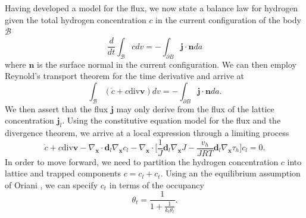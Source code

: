 \documentclass[10pt]{elsarticle}
\newcommand{\mbs}[1]{\boldsymbol{#1}}
\def\bs{{\mbs{s}}} \def\bt{{\mbs{t}}} \def\bu{{\mbs{u}}}
\def\bs{\boldsymbol}
\begin{document}
Having developed a model for the flux, we now state a balance law for hydrogen given the total hydrogen concentration $c$ in the current configuration of the body $\mathcal{B}$
%
\begin{equation}
\label{eq.hconservation} \frac{d}{dt} \int_{\mathcal{B}} c dv = -\int_{\partial B} \bs{j} \cdot \bs{n} da 
\end{equation}
%
where $\bs{n}$ is the surface normal in the current configuration. We can then employ Reynold's transport theorem for the time derivative and arrive at 
%
\begin{equation}
\label{eq.hconservation2}  \int_{\mathcal{B}} (\dot{c} + c\text{div}\bs{v}) dv = -\int_{\partial B} \bs{j} \cdot \bs{n} da.
\end{equation}   
%
We then assert that the flux $\bs{j}$ may only derive from the flux of the lattice concentration $\bs{j}_{l}$. Using the constitutive equation model for the flux and the divergence theorem, we arrive at a local expression through a limiting process
%
\begin{equation}
\label{eq.hconservation3}  \dot{c} + c\text{div}\bs{v} - \nabla_{\bs{x}} \cdot \bs{d}_{l} \nabla_{\bs{x}}c_{l}   -  \nabla_{\bs{x}} \cdot \bigg[ \frac{1}{J} \bs{d}_{l} \nabla_{\bs{x}}J -  \frac{v_{h}}{JR T} \bs{d}_{l} \nabla_{\bs{x}}\tau_{h}\bigg] c_{l}  =  0.
\end{equation}
%
In order to move forward, we need to partition the hydrogen concentration $c$ into lattice and trapped components $c = c_{l} + c_{t}$. Using an the equilibrium assumption of Oriani \cite{Oriani1970}, we can specify $c_{t}$ in terms of the occupancy
%
\begin{equation}
\label{eq.oriani1} \theta_{t} = \frac{1}{1 + \frac{1}{k_{t} \theta_{l}}}.
\end{equation}
\end{document}
